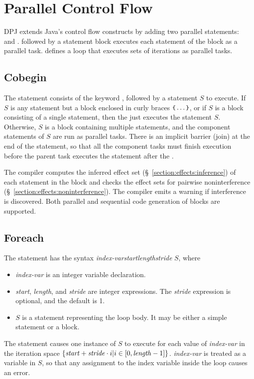 \section{Parallel Control Flow}
\label{section:parallel}

DPJ extends Java's control flow constructs by adding two parallel
statements:  and .   followed
by a statement block executes each statement of the block as a
parallel task.   defines a loop that executes sets of
iterations as parallel tasks.

\subsection{Cobegin}


The  statement consists of the keyword ,
followed by a statement $S$ to execute.  If $S$ is any statement but a
block enclosed in curly braces $\mbox{\small{\texttt{\{}}} \ldots \mbox{\small{\texttt{\}}}}$, or if $S$
is a block consisting of a single statement, then the 
just executes the statement $S$.  Otherwise, $S$ is a block containing
multiple statements, and the component statements of $S$ are run as
parallel tasks.  There is an implicit barrier (join) at the end of the
 statement, so that all the component tasks must finish
execution before the parent task executes the statement after the
.

The compiler computes the inferred effect set
(\S~\ref{section:effects:inference}) of each statement in the block and checks
the effect sets for pairwise noninterference
(\S~\ref{section:effects:noninterference}).  The compiler emits a warning if
interference is discovered.  Both parallel and sequential code
generation of  blocks are supported.

\subsection{Foreach}
\label{section:parallel:foreach}

The  statement has the syntax
\emph{index-var}\emph{start}\kwd{,
}\emph{length}\kwd{, }\emph{stride}\kwd{)} $S$, where 
%
\begin{itemize}
\item \emph{index-var} is an integer variable declaration.
%
\item \emph{start}, \emph{length}, and \emph{stride} are integer
  expressions.  The \emph{stride} expression is optional, and the
  default is 1.
%
\item $S$ is a statement representing the loop body.  It may be either
  a simple statement or a block.
%
\end{itemize}
%
The  statement causes one instance of $S$ to execute for
each value of \emph{index-var} in the iteration space
$\{\mbox{\textit{start}} + \mbox{\textit{stride}} \cdot i | i \in [0,
  \mbox{\textit{length}}-1]\}$.  \emph{index-var} is treated as a
 variable in $S$, so that any assignment to the index
variable inside the loop causes an error.

